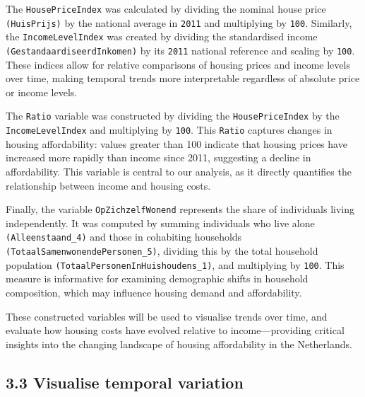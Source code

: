 \documentclass[
]{article}
\begin{document}
The \texttt{HousePriceIndex} was calculated by dividing the nominal
house price \texttt{(HuisPrijs)} by the national average in
\texttt{2011} and multiplying by \texttt{100}. Similarly, the
\texttt{IncomeLevelIndex} was created by dividing the standardised
income \texttt{(GestandaardiseerdInkomen)} by its \texttt{2011} national
reference and scaling by \texttt{100}. These indices allow for relative
comparisons of housing prices and income levels over time, making
temporal trends more interpretable regardless of absolute price or
income levels.

The \texttt{Ratio} variable was constructed by dividing the
\texttt{HousePriceIndex} by the \texttt{IncomeLevelIndex} and
multiplying by \texttt{100}. This \texttt{Ratio} captures changes in
housing affordability: values greater than 100 indicate that housing
prices have increased more rapidly than income since 2011, suggesting a
decline in affordability. This variable is central to our analysis, as
it directly quantifies the relationship between income and housing
costs.

Finally, the variable \texttt{OpZichzelfWonend} represents the share of
individuals living independently. It was computed by summing individuals
who live alone \texttt{(Alleenstaand\_4)} and those in cohabiting
households \texttt{(TotaalSamenwonendePersonen\_5)}, dividing this by
the total household population
\texttt{(TotaalPersonenInHuishoudens\_1)}, and multiplying by
\texttt{100}. This measure is informative for examining demographic
shifts in household composition, which may influence housing demand and
affordability.

These constructed variables will be used to visualise trends over time,
and evaluate how housing costs have evolved relative to
income---providing critical insights into the changing landscape of
housing affordability in the Netherlands.

\subsection{3.3 Visualise temporal
variation}\label{visualise-temporal-variation}
\end{document}
